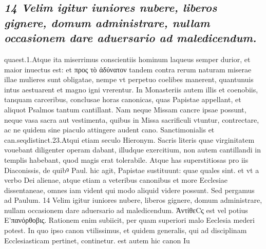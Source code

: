 \documentclass{article}
\begin{document}
\begin{pages}
\subsection*{\textit{14 Velim igitur iuniores nubere, liberos gignere, domum administrare, nullam occasionem dare aduersario ad maledicendum.}}quaest.1.Atque ita miserrimus conscientiis hominum laqueus semper durior, et maior inuectus est: et προς τὸ ἀδύνατον tandem contra rerum naturam miserae illae mulieres sunt obligatae, nempe vt perpetuo coelibes manerent, quantunuis intus aestuarent et magno igni vrerentur. In Monasteriis autem illis et coenobiis, tanquam carceribus, conclusae horas canonicas, quas Papistae appellant, et aliquot Psalmos tantum cantillant. Nam neque Missam cancre ipsae possunt, neque vasa sacra aut vestimenta, quibus in Missa sacrificuli vtuntur, contrectare, ac ne quidem sine piaculo attingere audent cano. Sanctimonialis et can.seqdistinct.23.Atqui etiam seculo Hieronym. Sacris literis quae virginitatem vouebant diligenter operam dabant, illudque exercitium, non autem cantillandi in templis habebant, quod magis erat tolerabile. Atque has superstitiosas pro iis Diaconissis, de quibꝰ Paul. hic agit, Papistae sustituunt: quae quales sint. et vt a verbo Dei alienae, atque etiam a veteribus canonibus et more Ecclesiae dissentaneae, omnes iam vident qui modo aliquid videre possunt. Sed pergamus ad Paulum. 14 Velim igitur iuniores nubere, liberos gignere, domum administrare, nullam occasionem dare aduersario ad maledicendum. ἈντίθεCς est vel potius Ε’πανόρθοβις. Rationem enim subiicit, per quam superiori malo Eeclesia mederi potest. In quo ipso canon vtilissimus, et quidem generalis, qui ad disciplinam Ecclesiasticam pertinet, continetur. est autem hic canon Iu\pend

\end{pages}
\end{document}
